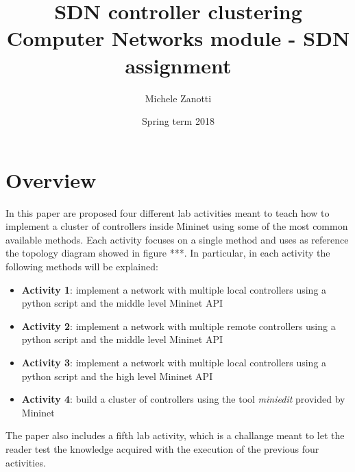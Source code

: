 \documentclass[12pt, a4paper]{article}
\title{SDN controller clustering \\ \large Computer Networks module - SDN assignment}
\author{Michele Zanotti}
\date{Spring term 2018}
\begin{document}
\maketitle


\section*{Overview}
In this paper are proposed four different lab activities meant to teach how to implement
a cluster of controllers inside Mininet using some of the most common available methods.
Each activity focuses on a single method and uses as reference the topology
diagram showed in figure ***. In particular, in each activity the following
methods will be explained:
\begin{itemize}
  \item \textbf{Activity 1}: implement a network with multiple local controllers using a python
  script and the middle level Mininet API
  \item \textbf{Activity 2}: implement a network with multiple remote controllers using a python
  script and the middle level Mininet API
  \item \textbf{Activity 3}: implement a network with multiple local controllers using a python
  script and the high level Mininet API
  \item \textbf{Activity 4}: build a cluster of controllers using the tool
  \emph{miniedit} provided by Mininet
\end{itemize}

The paper also includes a fifth lab activity, which is a challange meant
to let the reader test the knowledge acquired with the execution of the previous
four activities.



\end{document}
